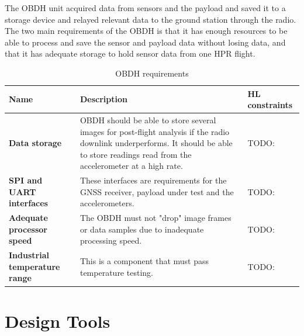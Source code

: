 \documentclass{report}
\begin{document}
The OBDH unit acquired data from sensors and the payload and saved it to a storage device and relayed relevant data to the ground station through the radio. The two main requirements of the OBDH is that it has enough resources to be able to process and save the sensor and payload data without losing data, and that it has adequate storage to hold sensor data from one HPR flight.

\begin{table}[H]
  \centering
  \begin{tabular}{|L{0.2\textwidth}|L{0.495\textwidth}|L{0.2\textwidth}|}
    \hline
    \textbf{Name}                         & \textbf{Description}                                                                                                                                                                      & \textbf{HL constraints} \\ \hline
    \textbf{Data storage}                 & OBDH should be able to store several images for post-flight analysis if the radio downlink underperforms. It should be able to store readings read from the accelerometer at a high rate. & TODO:                   \\\hline
    \textbf{SPI and UART interfaces}      & These interfaces are requirements for the GNSS receiver, payload under test and the accelerometers.                                                                                       & TODO:                   \\\hline
    \textbf{Adequate processor speed}     & The OBDH must not "drop" image frames or data samples due to inadequate processing speed.                                                                                                 & TODO:                   \\\hline
    \textbf{Industrial temperature range} & This is a component that must pass temperature testing.                                                                                                                                   & TODO:                   \\\hline
  \end{tabular}
  \caption{OBDH requirements}
  \label{tabl:obdh-requirements}
\end{table}


\section{Design Tools}
\label{sec:design-tools}
\end{document}
